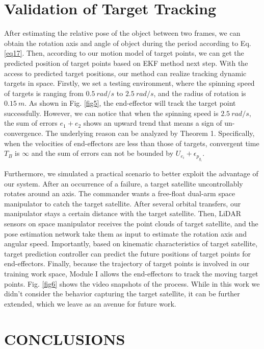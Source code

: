 \documentclass{article}
\begin{document}
\section{Validation of Target Tracking}
After estimating the relative pose of the object between two frames, we can obtain the rotation axis and angle of object during the period according to Eq. \eqref{eq17}. Then, according to our motion model of target points, we can get the predicted position of target points based on EKF method next step. 
With the access to predicted target positions, our method can realize tracking dynamic targets in space. Firstly, we set a testing environment, where the spinning speed of targets is ranging from $0.5 \ rad/s$ to $2.5 \ rad/s$, and the radius of rotation is $0.15 \ m$. As shown in Fig. \ref{fig5}, the end-effector will track the target point successfully. However, we can notice that when the spinning speed is $2.5 \ rad/s$, the sum of errors $e_1+e_2$ shows an upward trend that means a sign of un-convergence. The underlying reason can be analyzed by Theorem 1. Specifically, when the velocities of end-effectors are less than those of targets, convergent time $T_B$ is $\infty$ and the sum of errors can not be bounded by $U_{e_i}+\epsilon_{p_{g_i}}$. 

Furthermore, we simulated a practical scenario to better exploit the advantage of our system. After an occurrence of a failure, a target satellite uncontrollably rotates around an axis. The commander wants a free-float dual-arm space manipulator to catch the target satellite. After several orbital transfers, our manipulator stays a certain distance with the target satellite. Then, LiDAR sensors on space manipulator receives the point clouds of target satellite, and the pose estimation network take them as input to estimate the rotation axis and angular speed. Importantly, based on kinematic characteristics of target satellite, target prediction controller can predict the future positions of target points for end-effectors. Finally, because the trajectory of target points is involved in our training work space, Module I allows the end-effectors to track the moving target points. Fig. \ref{fig6} shows the video snapshots of the process. While in this work we didn't consider the behavior capturing the target satellite, it can be further extended, which we leave as an avenue for future work. 



\section{CONCLUSIONS}
\end{document}

